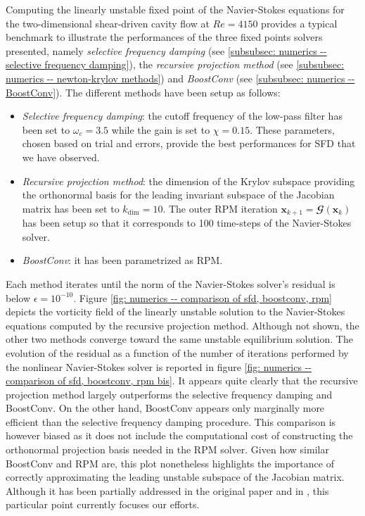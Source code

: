     Computing the linearly unstable fixed point of the Navier-Stokes equations for the two-dimensional shear-driven cavity flow at $Re=4150$ provides a typical benchmark to illustrate the performances of the three fixed points solvers presented, namely \emph{selective frequency damping} (see \textsection \ref{subsubsec: numerics -- selective frequency damping}), the \emph{recursive projection method} (see \textsection \ref{subsubsec: numerics -- newton-krylov methods}) and \emph{BoostConv} (see \textsection \ref{subsubsec: numerics -- BoostConv}). The different methods have been setup as follows:
    \begin{itemize}
      \item \emph{Selective frequency damping}: the cutoff frequency of the low-pass filter has been set to $\omega_c = 3.5$ while the gain is set to $\chi = 0.15$. These parameters, chosen based on trial and errors, provide the best performances for SFD that we have observed.

      \item \emph{Recursive projection method}: the dimension of the Krylov subspace providing the orthonormal basis for the leading invariant subspace of the Jacobian matrix has been set to $k_{\mathrm{dim}} = 10$. The outer RPM iteration $\mathbf{x}_{k+1} = \mathbfcal{G}(\mathbf{x}_k)$ has been setup so that it corresponds to 100 time-steps of the Navier-Stokes solver.

      \item \emph{BoostConv}: it has been parametrized as RPM.
    \end{itemize}
    Each method iterates until the norm of the Navier-Stokes solver's residual is below $\epsilon = 10^{-10}$. Figure \ref{fig: numerics -- comparison of sfd, boostconv, rpm} depicts the vorticity field of the linearly unstable solution to the Navier-Stokes equations computed by the recursive projection method. Although not shown, the other two methods converge toward the same unstable equilibrium solution. The evolution of the residual as a function of the number of iterations performed by the nonlinear Navier-Stokes solver is reported in figure \ref{fig: numerics -- comparison of sfd, boostconv, rpm bis}. It appears quite clearly that the recursive projection method largely outperforms the selective frequency damping and BoostConv. On the other hand, BoostConv appears only marginally more efficient than the selective frequency damping procedure. This comparison is however biased as it does not include the computational cost of constructing the orthonormal projection basis needed in the RPM solver. Given how similar BoostConv and RPM are, this plot nonetheless highlights the importance of correctly approximating the leading unstable subspace of the Jacobian matrix. Although it has been partially addressed in the original paper \cite{siam:shroff:1993} and in \cite{jcp:renac:2011}, this particular point currently focuses our efforts.

